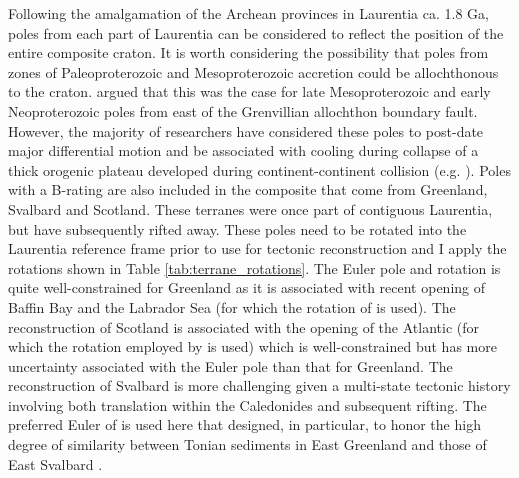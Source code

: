 \documentclass[11pt,letterpaper]{article}
\begin{document}
Following the amalgamation of the Archean provinces in Laurentia  ca. 1.8 Ga, poles from each part of Laurentia can be considered to reflect the position of the entire composite craton. It is worth considering the possibility that poles from zones of Paleoproterozoic and Mesoproterozoic accretion could be allochthonous to the craton. \cite{Halls2015b} argued that this was the case for late Mesoproterozoic and early Neoproterozoic poles from east of the Grenvillian allochthon boundary fault. However, the majority of researchers have considered these poles to post-date major differential motion and be associated with cooling during collapse of a thick orogenic plateau developed during continent-continent collision (e.g. \citealp{Brown2012a}). Poles with a B-rating are also included in the composite that come from Greenland, Svalbard and Scotland. These terranes were once part of contiguous Laurentia, but have subsequently rifted away. These poles need to be rotated into the Laurentia reference frame prior to use for tectonic reconstruction and I apply the  rotations shown in Table \ref{tab:terrane_rotations}. The Euler pole and rotation is quite well-constrained for Greenland as it is associated with recent opening of Baffin Bay and the Labrador Sea (for which the rotation of \citealp{Roest1989a} is used). The reconstruction of Scotland is associated with the opening of the Atlantic (for which the rotation employed by \citealp{Torsvik2017a} is used) which is well-constrained but has more uncertainty associated with the Euler pole than that for Greenland. The reconstruction of Svalbard is more challenging given a multi-state tectonic history involving both translation within the Caledonides and subsequent rifting. The preferred Euler of \cite{Maloof2006a} is used here that designed, in particular, to honor the high degree of similarity between Tonian sediments in East Greenland \citep{Hoffman2012a} and those of East Svalbard \citep{Maloof2006a}.
\end{document}
